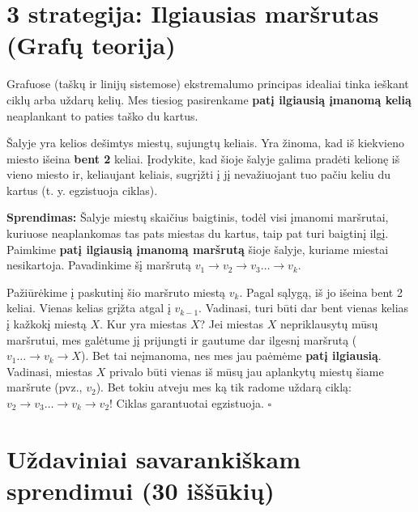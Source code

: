 \documentclass[11pt,a4paper]{scrartcl}
\newenvironment{solution}
    {\begin{list}{}{\setlength{\leftmargin}{10pt}\setlength{\rightmargin}{10pt}}\item[]}
    {\end{list}}
\begin{document}
\section{3 strategija: Ilgiausias maršrutas (Grafų teorija)}

Grafuose (taškų ir linijų sistemose) ekstremalumo principas idealiai tinka ieškant ciklų arba uždarų kelių. Mes tiesiog pasirenkame \textbf{patį ilgiausią įmanomą kelią} neaplankant to paties taško du kartus.

\begin{example}
Šalyje yra kelios dešimtys miestų, sujungtų keliais. Yra žinoma, kad iš kiekvieno miesto išeina \textbf{bent 2} keliai. Įrodykite, kad šioje šalyje galima pradėti kelionę iš vieno miesto ir, keliaujant keliais, sugrįžti į jį nevažiuojant tuo pačiu keliu du kartus (t. y. egzistuoja ciklas).
\end{example}

\begin{solution}
\textbf{Sprendimas:}
Šalyje miestų skaičius baigtinis, todėl visi įmanomi maršrutai, kuriuose neaplankomas tas pats miestas du kartus, taip pat turi baigtinį ilgį. 
Paimkime \textbf{patį ilgiausią įmanomą maršrutą} šioje šalyje, kuriame miestai nesikartoja. Pavadinkime šį maršrutą $v_1 \to v_2 \to v_3 \dots \to v_k$. 

Pažiūrėkime į paskutinį šio maršruto miestą $v_k$. Pagal sąlygą, iš jo išeina bent 2 keliai. Vienas kelias grįžta atgal į $v_{k-1}$. Vadinasi, turi būti dar bent vienas kelias į kažkokį miestą $X$.
Kur yra miestas $X$? 
Jei miestas $X$ nepriklausytų mūsų maršrutui, mes galėtume jį prijungti ir gautume dar ilgesnį maršrutą ($v_1 \dots \to v_k \to X$). Bet tai neįmanoma, nes mes jau paėmėme \textbf{patį ilgiausią}.
Vadinasi, miestas $X$ privalo būti vienas iš mūsų jau aplankytų miestų šiame maršrute (pvz., $v_2$). Bet tokiu atveju mes ką tik radome uždarą ciklą: $v_2 \to v_3 \dots \to v_k \to v_2$! Ciklas garantuotai egzistuoja. \hfill $\square$
\end{solution}

\newpage
\section{Uždaviniai savarankiškam sprendimui (30 iššūkių)}
\end{document}

